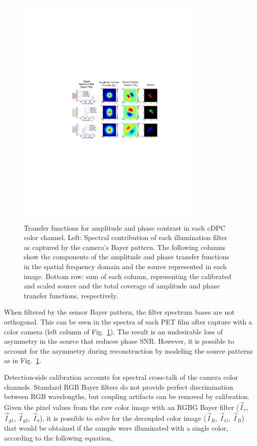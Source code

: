 \begin{figure}[tbh]
\centering
\includegraphics[width=0.8\textwidth]{figures/fig_cdpc_transferfuncs.pdf}
\caption{\label{fig:transferfunctions}
Transfer functions for amplitude and phase contrast in each cDPC color channel. Left: Spectral contribution of each illumination filter as captured by the camera's Bayer pattern. The following columns show the components of the amplitude and phase transfer functions in the spatial frequency domain and the source represented in each image.  Bottom row: sum of each column, representing the calibrated and scaled source and the total coverage of amplitude and phase transfer functions, respectively.}
\end{figure}

When filtered by the sensor Bayer pattern, the filter spectrum bases are not orthogonal. This can be seen in the spectra of each PET film after capture with a color camera (left column of Fig.~\ref{fig:transferfunctions}). The result is an undesirable loss of asymmetry in the source that reduces phase SNR. However, it is possible to account for the asymmetry during reconstruction by modeling the source patterns as in Fig.~\ref{fig:transferfunctions}.

Detection-side calibration accounts for spectral cross-talk of the camera color channels. Standard RGB Bayer filters do not provide perfect discrimination between RGB wavelengths, but coupling artifacts can be removed by calibration. Given the pixel values from the raw color image with an RGBG Bayer filter ($\vec{I}_r$, $\vec{I}_{g1}$, $\vec{I}_{g2}$, $\vec{I}_b$), it is possible to solve for the decoupled color image ($\vec{I}_R$, $\vec{I}_{G}$, $\vec{I}_{B}$) that would be obtained if the sample were illuminated with a single color, according to the following equation,

